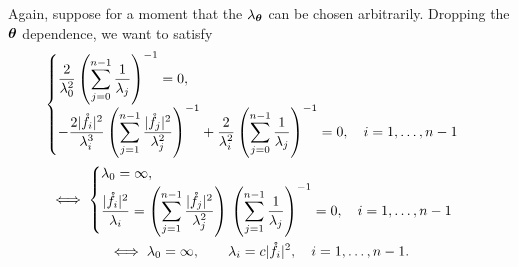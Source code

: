 \documentclass{amsart}
\begin{document}
Again, suppose for a moment that the $\lambda_{\boldsymbol{\theta}}$ can be chosen arbitrarily.  Dropping the $\boldsymbol{\theta}$ dependence, we want to satisfy
\begin{gather*}
    \begin{cases}
    \displaystyle \frac {2}{\lambda_0^2} \left( \sum_{j=0}^{n-1} \frac{1}{\lambda_{j}} \right)^{-1}  = 0, \\ 
    \displaystyle - \frac{2\lvert\mathring{f}_i\rvert^2}{\lambda_{i}^3} \left( \sum_{j=1}^{n-1} \frac{\lvert\mathring{f}_j\rvert^2}{\lambda_{j}^2} \right)^{-1} +  \frac{2}{\lambda_i^2} \left( \sum_{j=0}^{n-1} \frac{1}{\lambda_{j}} \right)^{-1} = 0, \quad i = 1, \ldots, n-1
    \end{cases}
    \\
    \iff
    \begin{cases}
    \lambda_0 = \infty,  \\ 
    \displaystyle \frac{\lvert\mathring{f}_i\rvert^2}{\lambda_{i}} =  \left( \sum_{j=1}^{n-1} \frac{\lvert\mathring{f}_j\rvert^2}{\lambda_{j}^2} \right) \, \left( \sum_{j=1}^{n-1} \frac{1}{\lambda_{j}} \right)^{-1} = 0, \quad i = 1, \ldots, n-1
    \end{cases}
    \\
    \iff
     \lambda_0 = \infty, \qquad \lambda_i = c \lvert\mathring{f}_i\rvert^2, \quad i = 1, \ldots, n-1.
\end{gather*}
\end{document}
